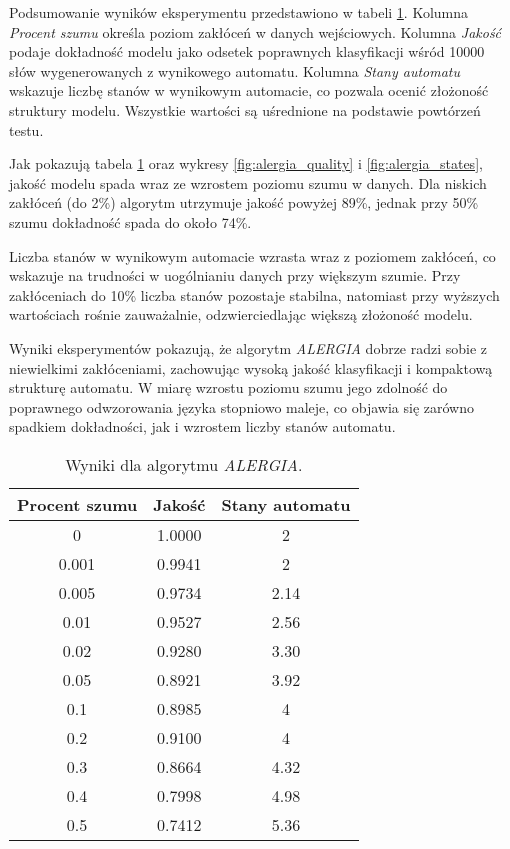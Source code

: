 Podsumowanie wyników eksperymentu przedstawiono w tabeli \ref{tab:alergia_results}. Kolumna \textit{Procent szumu} określa poziom zakłóceń w danych wejściowych. Kolumna \textit{Jakość} podaje dokładność modelu jako odsetek poprawnych klasyfikacji wśród 10000 słów wygenerowanych z wynikowego automatu. Kolumna \textit{Stany automatu} wskazuje liczbę stanów w wynikowym automacie, co pozwala ocenić złożoność struktury modelu. Wszystkie wartości są uśrednione na podstawie powtórzeń testu.

Jak pokazują tabela \ref{tab:alergia_results} oraz wykresy \ref{fig:alergia_quality} i \ref{fig:alergia_states}, jakość modelu spada wraz ze wzrostem poziomu szumu w danych. Dla niskich zakłóceń (do 2\%) algorytm utrzymuje jakość powyżej 89\%, jednak przy 50\% szumu dokładność spada do około 74\%.  

Liczba stanów w wynikowym automacie wzrasta wraz z poziomem zakłóceń, co wskazuje na trudności w uogólnianiu danych przy większym szumie. Przy zakłóceniach do 10\% liczba stanów pozostaje stabilna, natomiast przy wyższych wartościach rośnie zauważalnie, odzwierciedlając większą złożoność modelu.

Wyniki eksperymentów pokazują, że algorytm \textit{ALERGIA} dobrze radzi sobie z niewielkimi zakłóceniami, zachowując wysoką jakość klasyfikacji i kompaktową strukturę automatu. W miarę wzrostu poziomu szumu jego zdolność do poprawnego odwzorowania języka stopniowo maleje, co objawia się zarówno spadkiem dokładności, jak i wzrostem liczby stanów automatu.

\begin{table}[h]
\centering
\caption{Wyniki dla algorytmu \textit{ALERGIA}.}
\label{tab:alergia_results}
\begin{tabular}{|c|c|c|}
\hline
Procent szumu & Jakość & Stany automatu \\ \hline
0             & 1.0000 & 2             \\ \hline
0.001         & 0.9941 & 2             \\ \hline
0.005         & 0.9734 & 2.14          \\ \hline
0.01          & 0.9527 & 2.56          \\ \hline
0.02          & 0.9280 & 3.30           \\ \hline
0.05          & 0.8921 & 3.92          \\ \hline
0.1           & 0.8985 & 4             \\ \hline
0.2           & 0.9100 & 4             \\ \hline
0.3           & 0.8664 & 4.32          \\ \hline
0.4           & 0.7998 & 4.98          \\ \hline
0.5           & 0.7412 & 5.36          \\ \hline
\end{tabular}
\end{table}

